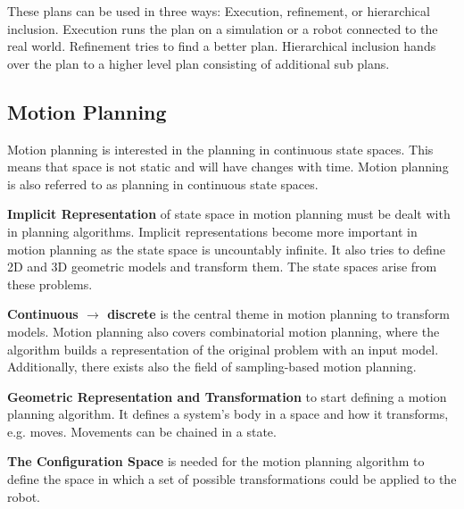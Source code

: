 These plans can be used in three ways: Execution, refinement, or hierarchical inclusion. Execution runs the plan on a simulation or a robot connected to the real world. Refinement tries to find a better plan. Hierarchical inclusion hands over the plan to a higher level plan consisting of additional sub plans. \cite{planning_algorithms_steven_m_lavalle}

\subsection{Motion Planning} \label{sec:Motion Planning}
Motion planning is interested in the planning in continuous state spaces. This means that space is not static and will have changes with time. Motion planning is also referred to as planning in continuous state spaces. \cite{planning_algorithms_steven_m_lavalle}

\textbf{Implicit Representation} of state space in motion planning must be dealt with in planning algorithms. Implicit representations become more important in motion planning as the state space is uncountably infinite. It also tries to define 2D and 3D geometric models and transform them. The state spaces arise from these problems. \cite{planning_algorithms_steven_m_lavalle}

\textbf{Continuous $\rightarrow$ discrete} is the central theme in motion planning to transform models. Motion planning also covers combinatorial motion planning, where the algorithm builds a representation of the original problem with an input model. Additionally, there exists also the field of sampling-based motion planning. \cite{planning_algorithms_steven_m_lavalle}

\textbf{Geometric Representation and Transformation} to start defining a motion planning algorithm. It defines a system's body in a space and how it transforms, e.g. moves. Movements can be chained in a state. \cite{planning_algorithms_steven_m_lavalle}

\textbf{The Configuration Space} is needed for the motion planning algorithm to define the space in which a set of possible transformations could be applied to the robot. \cite{planning_algorithms_steven_m_lavalle}

